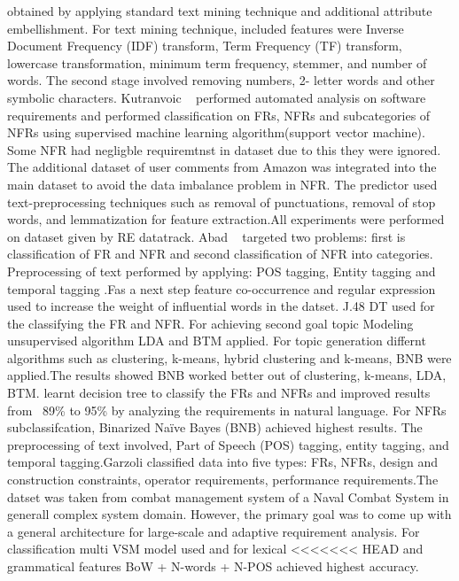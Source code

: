 obtained by applying standard text mining technique and additional attribute
embellishment. For text mining technique, included features were Inverse
Document Frequency (IDF) transform, Term Frequency (TF) transform, lowercase
transformation, minimum term frequency, stemmer, and number of words. The second
stage involved removing numbers, 2- letter words and other symbolic characters.
Kutranvoic \etal ~ \cite {Kurtanovic:2017}performed automated analysis on
software requirements and performed classification on FRs, NFRs and
subcategories of NFRs using supervised machine learning algorithm(support vector
machine). Some NFR had negligble requiremtnst in dataset due to this they were
ignored. The additional dataset of user comments from Amazon was integrated into
the main dataset to avoid the data imbalance problem in NFR. The predictor used
text-preprocessing techniques such as removal of punctuations, removal of stop
words, and lemmatization for feature extraction.All experiments were performed
on dataset given by RE datatrack.
 Abad \etal ~ \cite{Abad:2017} targeted two problems: first is classification of 
 FR and NFR and second classification of NFR into categories. Preprocessing of
 text performed by applying: POS tagging, Entity tagging and temporal tagging
 .Fas a next step feature co-occurrence and regular expression used to increase
 the weight of influential words in the datset. J.48 DT used for the classifying
 the FR and NFR. For achieving second goal topic Modeling unsupervised algorithm
 LDA and BTM applied. For topic generation differnt algorithms such as
 clustering, k-means, hybrid clustering and k-means, BNB were applied.The
 results showed BNB worked better out of clustering, k-means, LDA, BTM.
learnt decision tree to classify the FRs and NFRs and improved results from
~89\% to 95\% by analyzing the requirements in natural language. For NFRs
subclassifcation, Binarized Naïve Bayes (BNB) achieved highest results. The
preprocessing of text involved, Part of Speech (POS) tagging, entity tagging,
and temporal tagging.Garzoli \cite {Garzoli:2013} classified data into five
types: FRs, NFRs, design and construction constraints, operator requirements,
performance requirements.The datset was taken from combat management system of a
Naval Combat System in generall complex system domain. However, the primary goal
was to come up with a general architecture for large-scale and adaptive
requirement analysis. For classification multi VSM model used and for lexical
<<<<<<< HEAD
and grammatical features BoW + N-words + N-POS achieved highest accuracy.\\

